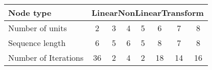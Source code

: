 \begin{tabular}{l|ccccccc|}
Node type & \multicolumn{7}{c}{LinearNonLinearTransform} \\
\hline
Number of units & 2 & 3 & 4 & 5 & 6 & 7 & 8 \\
Sequence length & 6 & 5 & 6 & 5 & 8 & 7 & 8 \\
Number of Iterations & 36 & 2 & 4 & 2 & 18 & 14 & 16 \\
\hline
\end{tabular}
